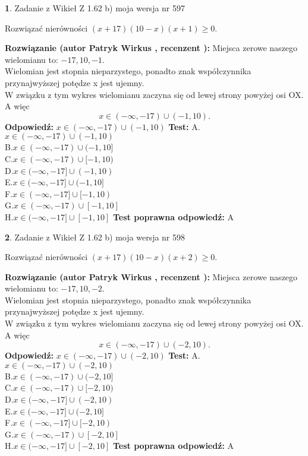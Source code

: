 \documentclass[12pt, a4paper]{article}
\theoremstyle{definition} %
\newtheorem{zad}{}
\newcommand{\zadStart}[1]{\begin{zad}#1\newline}
\newcommand{\zadStop}{\end{zad}}
\newcommand{\rozwStart}[2]{\noindent \textbf{Rozwiązanie (autor #1 , recenzent #2): }\newline}
\newcommand{\rozwStop}{\newline}
\newcommand{\odpStart}{\noindent \textbf{Odpowiedź:}\newline}
\newcommand{\odpStop}{\newline}
\newcommand{\testStart}{\noindent \textbf{Test:}\newline}
\newcommand{\testStop}{\newline}
\newcommand{\kluczStart}{\noindent \textbf{Test poprawna odpowiedź:}\newline}
\newcommand{\kluczStop}{\newline}
\begin{document}
\zadStart{Zadanie z Wikieł Z 1.62 b) moja wersja nr 597}

Rozwiązać nierówności $(x+17)(10-x)(x+1)\ge0$.
\zadStop
\rozwStart{Patryk Wirkus}{}
Miejsca zerowe naszego wielomianu to: $-17, 10, -1$.\\
Wielomian jest stopnia nieparzystego, ponadto znak współczynnika przy\linebreak najwyższej potędze x jest ujemny.\\ W związku z tym wykres wielomianu zaczyna się od lewej strony powyżej osi OX. A więc $$x \in (-\infty,-17) \cup (-1,10).$$
\rozwStop
\odpStart
$x \in (-\infty,-17) \cup (-1,10)$
\odpStop
\testStart
A.$x \in (-\infty,-17) \cup (-1,10)$\\
B.$x \in (-\infty,-17) \cup (-1,10]$\\
C.$x \in (-\infty,-17) \cup [-1,10)$\\
D.$x \in (-\infty,-17] \cup (-1,10)$\\
E.$x \in (-\infty,-17] \cup (-1,10]$\\
F.$x \in (-\infty,-17] \cup [-1,10)$\\
G.$x \in (-\infty,-17) \cup [-1,10]$\\
H.$x \in (-\infty,-17] \cup [-1,10]$
\testStop
\kluczStart
A
\kluczStop



\zadStart{Zadanie z Wikieł Z 1.62 b) moja wersja nr 598}

Rozwiązać nierówności $(x+17)(10-x)(x+2)\ge0$.
\zadStop
\rozwStart{Patryk Wirkus}{}
Miejsca zerowe naszego wielomianu to: $-17, 10, -2$.\\
Wielomian jest stopnia nieparzystego, ponadto znak współczynnika przy\linebreak najwyższej potędze x jest ujemny.\\ W związku z tym wykres wielomianu zaczyna się od lewej strony powyżej osi OX. A więc $$x \in (-\infty,-17) \cup (-2,10).$$
\rozwStop
\odpStart
$x \in (-\infty,-17) \cup (-2,10)$
\odpStop
\testStart
A.$x \in (-\infty,-17) \cup (-2,10)$\\
B.$x \in (-\infty,-17) \cup (-2,10]$\\
C.$x \in (-\infty,-17) \cup [-2,10)$\\
D.$x \in (-\infty,-17] \cup (-2,10)$\\
E.$x \in (-\infty,-17] \cup (-2,10]$\\
F.$x \in (-\infty,-17] \cup [-2,10)$\\
G.$x \in (-\infty,-17) \cup [-2,10]$\\
H.$x \in (-\infty,-17] \cup [-2,10]$
\testStop
\kluczStart
A
\kluczStop
\end{document}
